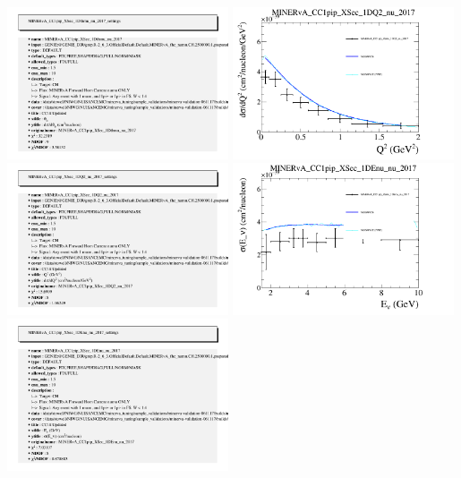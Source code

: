 \documentclass{article}
\begin{document}
\includegraphics[width=0.49\textwidth]{figures/nuisance_MINERvA_CC1pip_XSec_1Dthmu_nu_2017_info.png}
\centering
\includegraphics[width=0.49\textwidth]{figures/nuisance_MINERvA_CC1pip_XSec_1DQ2_nu_2017_comp.png}
\includegraphics[width=0.49\textwidth]{figures/nuisance_MINERvA_CC1pip_XSec_1DQ2_nu_2017_info.png}
\centering
\includegraphics[width=0.49\textwidth]{figures/nuisance_MINERvA_CC1pip_XSec_1DEnu_nu_2017_comp.png}
\includegraphics[width=0.49\textwidth]{figures/nuisance_MINERvA_CC1pip_XSec_1DEnu_nu_2017_info.png}
\end{document}
